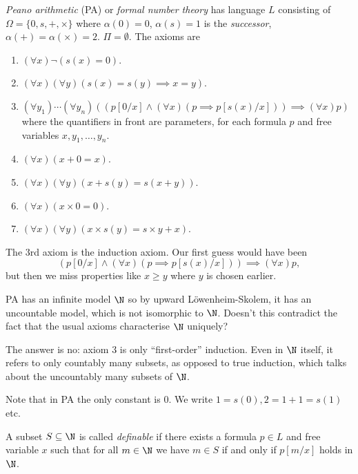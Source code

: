 \documentclass[a4paper]{article}
\begin{document}
\begin{definition}
  \emph{Peano arithmetic} (PA) or \emph{formal number theory} has language \(L\) consisting of \(\Omega = \{0, s, + ,\times\}\) where \(\alpha(0) = 0\), \(\alpha(s) = 1\) is the \emph{successor}, \(\alpha(+) = \alpha(\times) = 2\). \(\Pi = \emptyset\). The axioms are
  \begin{enumerate}
  \item \((\forall x) \neg(s(x) = 0)\).
  \item \((\forall x)(\forall y) (s(x) = s(y) \implies x = y)\).
  \item \((\forall y_1)\cdots (\forall y_n) ((p[0/x] \land (\forall x) (p \implies p[s(x)/x])) \implies (\forall x) p)\) where the quantifiers in front are parameters, for each formula \(p\) and free variables \(x, y_1, \dots, y_n\).
  \item \((\forall x) (x + 0 = x)\).
  \item \((\forall x) (\forall y) (x + s(y) = s(x + y))\).
  \item \((\forall x) (x \times 0 = 0)\).
  \item \((\forall x)(\forall y) (x \times s(y) = s \times y + x)\).
  \end{enumerate}
\end{definition}

\begin{note}
  The 3rd axiom is the induction axiom. Our first guess would have been
  \[
    (p[0/x] \land (\forall x) (p \implies p[s(x)/x])) \implies (\forall x) p,
  \]
  but then we miss properties like \(x \geq y\) where \(y\) is chosen earlier.
\end{note}

PA has an infinite model \(\N\) so by upward Löwenheim-Skolem, it has an uncountable model, which is not isomorphic to \(\N\). Doesn't this contradict the fact that the usual axioms characterise \(\N\) uniquely?

The answer is no: axiom 3 is only ``first-order'' induction. Even in \(\N\) itself, it refers to only countably many subsets, as opposed to true induction, which talks about the uncountably many subsets of \(\N\).

Note that in PA the only constant is \(0\). We write \(1 = s(0), 2 = 1 + 1 = s(1)\) etc.

\begin{definition}[Definable]
  A subset \(S \subseteq \N\) is called \emph{definable} if there exists a formula \(p \in L\) and free variable \(x\) such that for all \(m \in \N\) we have \(m \in S\) if and only if \(p[m/x]\) holds in \(\N\).
\end{definition}
\end{document}
